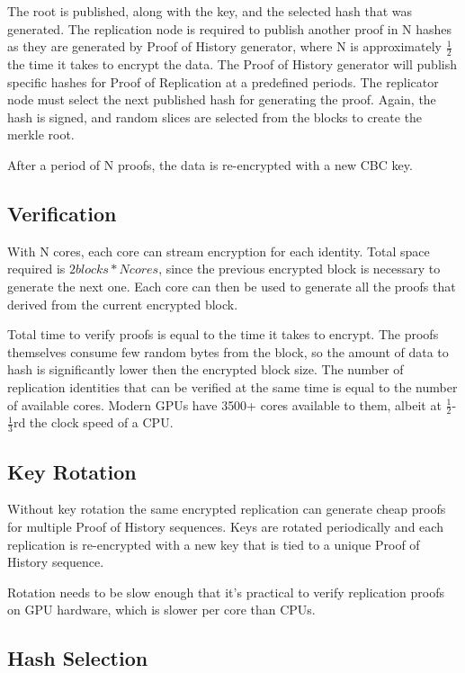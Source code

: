 \documentclass[12pt]{article}
\begin{document}
The root is published, along with the key, and the selected hash that was generated. The replication node is required to publish another proof in N hashes as they are generated by Proof of History generator, where N is approximately \(\frac{1}{2}\) the time it takes to encrypt the data. The Proof of History generator will publish specific hashes for Proof of Replication at a predefined periods. The replicator node must select the next published hash for generating the proof. Again, the hash is signed, and random slices are selected from the blocks to create the merkle root.

After a period of N proofs, the data is re-encrypted with a new CBC key.
\subsection{Verification}

With N cores, each core can stream encryption for each identity. Total space required is \(2 blocks * N cores\), since the previous encrypted block is necessary to generate the next one. Each core can then be used to generate all the proofs that derived from the current encrypted block.

Total time to verify proofs is equal to the time it takes to encrypt. The proofs themselves consume few random bytes from the block, so the amount of data to hash is significantly lower then the encrypted block size.  The number of replication identities that can be verified at the same time is equal to the number of available cores. Modern GPUs have 3500+ cores available to them, albeit at \(\frac{1}{2}\)-\(\frac{1}{3}\)rd the clock speed of a CPU.

\subsection{Key Rotation}

Without key rotation the same encrypted replication can generate cheap proofs for multiple Proof of History sequences. Keys are rotated periodically and each replication is re-encrypted with a new key that is tied to a unique Proof of History sequence.

Rotation needs to be slow enough that it’s practical to verify replication proofs on GPU hardware, which is slower per core than CPUs.

\subsection{Hash Selection}\label{hashselection}
\end{document}
